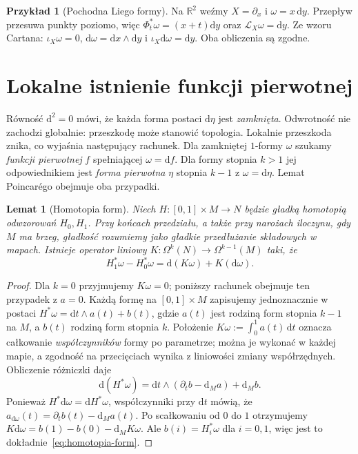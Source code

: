 \documentclass[11pt,a4paper,oneside]{report}
\newcommand{\R}{\mathbb{R}}
\newcommand{\Lie}{\mathcal L}
\newcommand{\dd}{\mathrm d}
\theoremstyle{plain}
\newtheorem{lemat}[twierdzenie]{Lemat}
\theoremstyle{definition}
\newtheorem{przyklad}[twierdzenie]{Przykład}
\theoremstyle{remark}
\begin{document}
\begin{przyklad}[Pochodna Liego formy]
Na $\R^2$ weźmy $X=\partial_x$ i $\omega=x\,\dd y$.
Przepływ przesuwa punkty poziomo, więc
$\Phi_t^*\omega=(x+t)\dd y$ oraz
$\Lie_X\omega=\dd y$. Ze wzoru Cartana:
$\iota_X\omega=0$, $\dd\omega=\dd x\wedge\dd y$
i $\iota_X\dd\omega=\dd y$. Oba obliczenia są zgodne.
\end{przyklad}
\section{Lokalne istnienie funkcji pierwotnej}
\label{sec:formy-poincare}

Równość $\dd^2=0$ mówi, że każda forma postaci
$\dd\eta$ jest \emph{zamknięta}. Odwrotność nie zachodzi
globalnie: przeszkodę może stanowić topologia. Lokalnie
przeszkoda znika, co wyjaśnia następujący rachunek.
Dla zamkniętej $1$-formy $\omega$ szukamy \emph{funkcji
pierwotnej} $f$ spełniającej $\omega=\dd f$.
Dla formy stopnia $k>1$ jej odpowiednikiem jest
\emph{forma pierwotna} $\eta$ stopnia $k-1$ z
$\omega=\dd\eta$. Lemat Poincarégo obejmuje
oba przypadki.

\begin{lemat}[Homotopia form]
\label{lem:homotopia-form}
Niech $H:[0,1]\times M\to N$ będzie gładką homotopią
odwzorowań $H_0,H_1$. Przy końcach przedziału, a także
przy narożach iloczynu, gdy $M$ ma brzeg, gładkość
rozumiemy jako gładkie przedłużanie składowych w mapach. Istnieje operator liniowy
$K:\Omega^k(N)\to\Omega^{k-1}(M)$ taki, że
\begin{equation}\label{eq:homotopia-form}
 H_1^*\omega-H_0^*\omega
 =\dd(K\omega)+K(\dd\omega).
\end{equation}
\end{lemat}
\begin{proof}
Dla $k=0$ przyjmujemy $K\omega=0$; poniższy rachunek
obejmuje ten przypadek z $a=0$. Każdą formę na
$[0,1]\times M$ zapisujemy jednoznacznie
w postaci $H^*\omega=\dd t\wedge a(t)+b(t)$,
gdzie $a(t)$ jest rodziną form stopnia $k-1$ na $M$,
a $b(t)$ rodziną form stopnia $k$. Położenie
$K\omega:=\int_0^1 a(t)\,\dd t$ oznacza całkowanie
\emph{współczynników} formy po parametrze; można je
wykonać w każdej mapie, a zgodność na przecięciach
wynika z liniowości zmiany współrzędnych.
Obliczenie różniczki daje
\[
 \dd(H^*\omega)
 =\dd t\wedge(\partial_tb-\dd_Ma)+\dd_Mb.
\]
Ponieważ $H^*\dd\omega=\dd H^*\omega$, współczynniki
przy $\dd t$ mówią, że
$a_{\dd\omega}(t)=\partial_tb(t)-\dd_Ma(t)$.
Po scałkowaniu od $0$ do $1$ otrzymujemy
$K\dd\omega=b(1)-b(0)-\dd_MK\omega$.
Ale $b(i)=H_i^*\omega$ dla $i=0,1$,
więc jest to dokładnie~\eqref{eq:homotopia-form}.
\end{proof}
\end{document}
